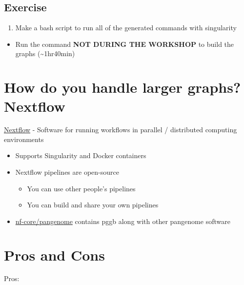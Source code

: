 \documentclass[
]{book}
\providecommand{\tightlist}{%
  \setlength{\itemsep}{0pt}\setlength{\parskip}{0pt}}
\begin{document}
\hypertarget{exercise-2}{%
\subsection{Exercise}\label{exercise-2}}

\begin{enumerate}
\def\labelenumi{\arabic{enumi}.}
\tightlist
\item
  Make a bash script to run all of the generated commands with singularity
\end{enumerate}

\begin{itemize}
\tightlist
\item
  Run the command \textbf{NOT DURING THE WORKSHOP} to build the graphs (\textasciitilde1hr40min)
\end{itemize}

\hypertarget{how-do-you-handle-larger-graphs-nextflow}{%
\section{How do you handle larger graphs? Nextflow}\label{how-do-you-handle-larger-graphs-nextflow}}

\href{https://www.nextflow.io/docs/latest/index.html}{Nextflow} - Software for running workflows in parallel / distributed computing environments

\begin{itemize}
\tightlist
\item
  Supports Singularity and Docker containers
\item
  Nextflow pipelines are open-source

  \begin{itemize}
  \tightlist
  \item
    You can use other people's pipelines
  \item
    You can build and share your own pipelines
  \end{itemize}
\item
  \href{https://nf-co.re/pangenome}{nf-core/pangenome} contains pggb along with other pangenome software
\end{itemize}

\hypertarget{pros-and-cons}{%
\section{Pros and Cons}\label{pros-and-cons}}

Pros:
\end{document}
